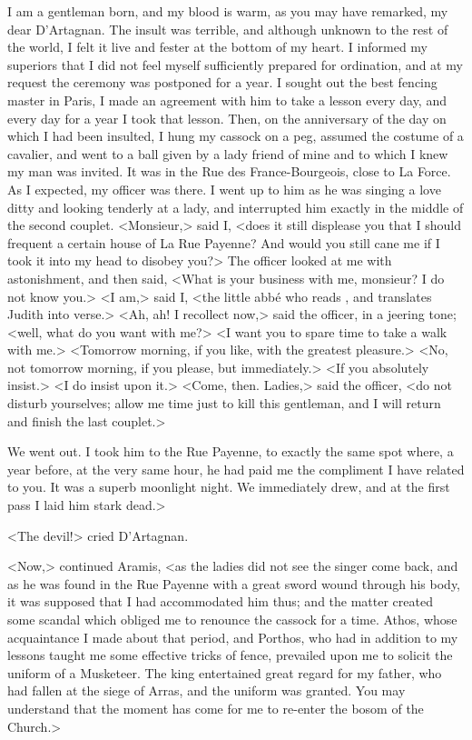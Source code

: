 I am a gentleman born, and my blood is warm, as you may have remarked, my dear D'Artagnan. The insult was terrible, and although unknown to the rest of the world, I felt it live and fester at the bottom of my heart. I informed my superiors that I did not feel myself sufficiently prepared for ordination, and at my request the ceremony was postponed for a year. I sought out the best fencing master in Paris, I made an agreement with him to take a lesson every day, and every day for a year I took that lesson. Then, on the anniversary of the day on which I had been insulted, I hung my cassock on a peg, assumed the costume of a cavalier, and went to a ball given by a lady friend of mine and to which I knew my man was invited. It was in the Rue des France-Bourgeois, close to La Force. As I expected, my officer was there. I went up to him as he was singing a love ditty and looking tenderly at a lady, and interrupted him exactly in the middle of the second couplet. <Monsieur,> said I, <does it still displease you that I should frequent a certain house of La Rue Payenne? And would you still cane me if I took it into my head to disobey you?> The officer looked at me with astonishment, and then said, <What is your business with me, monsieur? I do not know you.> <I am,> said I, <the little abbé who reads , and translates Judith into verse.> <Ah, ah! I recollect now,> said the officer, in a jeering tone; <well, what do you want with me?> <I want you to spare time to take a walk with me.> <Tomorrow morning, if you like, with the greatest pleasure.> <No, not tomorrow morning, if you please, but immediately.> <If you absolutely insist.> <I do insist upon it.> <Come, then. Ladies,> said the officer, <do not disturb yourselves; allow me time just to kill this gentleman, and I will return and finish the last couplet.> 

We went out. I took him to the Rue Payenne, to exactly the same spot where, a year before, at the very same hour, he had paid me the compliment I have related to you. It was a superb moonlight night. We immediately drew, and at the first pass I laid him stark dead.> 

<The devil!> cried D'Artagnan. 

<Now,> continued Aramis, <as the ladies did not see the singer come back, and as he was found in the Rue Payenne with a great sword wound through his body, it was supposed that I had accommodated him thus; and the matter created some scandal which obliged me to renounce the cassock for a time. Athos, whose acquaintance I made about that period, and Porthos, who had in addition to my lessons taught me some effective tricks of fence, prevailed upon me to solicit the uniform of a Musketeer. The king entertained great regard for my father, who had fallen at the siege of Arras, and the uniform was granted. You may understand that the moment has come for me to re-enter the bosom of the Church.> 

